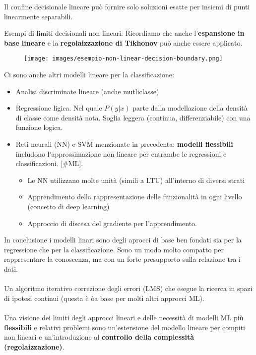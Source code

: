 \hspace{-15pt}Il confine decisionale lineare può fornire solo soluzioni esatte per insiemi di punti linearmente separabili.
\begin{example}
    Esempi di limiti decisionali non lineari. Ricordiamo che anche l'\textbf{espansione in base lineare} e la \textbf{regolaizzazione di Tikhonov} può anche essere applicato.
    \begin{figure}[h!]
        \centering
        \texttt{[image: images/esempio-non-linear-decision-boundary.png]}
    \end{figure}
\end{example}
\hspace{-15pt}Ci sono anche altri modelli lineare per la classificazione:
\begin{itemize}
    \item Analisi discriminate lineare (anche mutliclasse)
    \item Regressione ligica. Nel quale $P(y|x)$ parte dalla modellazione della densità di classe come densità nota. Soglia leggera (continua, differenziabile) con una funzione logica.
    \item Reti neurali (NN) e SVM menzionate in precedenta: \textbf{modelli flessibili} includono l'approssimazione non lineare per entrambe le regressioni e classificazioni. [\#ML].
    \begin{itemize}
        \item Le NN utilizzano molte unità (simili a LTU) all'interno di diversi strati
        \item Apprendimento della rappresentazione delle funzionalità in ogni livello (concetto di deep learning)
        \item Approccio di discesa del gradiente per l'apprendimento.
    \end{itemize}
\end{itemize}
In conclusione i modelli linari sono degli aprocci di base ben fondati sia per la regressione che per la classificazione.
Sono un modo molto compatto per rappresentare la conoscenza, ma con un forte presupporto sulla relazione tra i dati. \\\\
Un algoritmo iterativo correzione degli errori (LMS) che esegue la ricerca in spazi di ipotesi continui (questa è òa base per molti altri approcci ML).\\\\
Una visione dei limiti degli approcci lineari e delle necessità di modelli ML più \textbf{flessibili} e relativi problemi sono un'estensione del modello lineare per compiti non lineari e 
un'introduzione al \textbf{controllo della complessità (regolaizzazione)}.